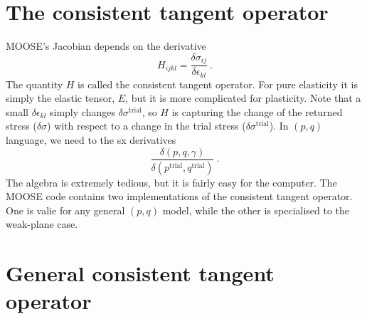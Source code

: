 \documentclass[]{scrreprt}
\begin{document}
\section{The consistent tangent operator}
MOOSE's Jacobian depends on the derivative
\begin{equation}
H_{ijkl} = \frac{\delta\sigma_{ij}}{\delta \epsilon_{kl}} \ .
\end{equation}
The quantity $H$ is called the consistent tangent operator.  For pure
elasticity it is simply the elastic tensor, $E$, but it is more
complicated for plasticity.  Note that a small $\delta\epsilon_{kl}$
simply changes $\delta\sigma^{\mathrm{trial}}$, so $H$ is capturing the
change of the returned stress ($\delta\sigma$) with respect to a
change in the trial stress ($\delta\sigma^{\mathrm{trial}}$).  In
$(p,q)$ language, we need to the sx derivatives
\begin{equation}
\frac{\delta (p, q, \gamma)}{\delta (p^{\mathrm{trial}},
  q^{\mathrm{trial}})} \ .
\end{equation}
The algebra is extremely tedious, but it is fairly easy for the
computer.  The MOOSE code contains two implementations of the
consistent tangent operator.  One is valie for any general $(p, q)$
model, while the other is specialised to the weak-plane case.

\section{General consistent tangent operator}
\end{document}
